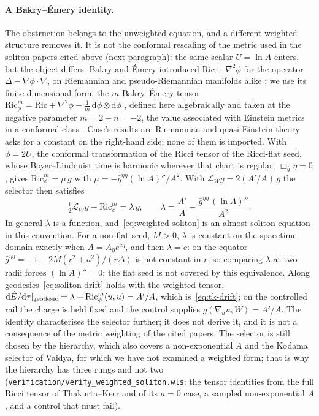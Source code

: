 \documentclass[12pt]{iopart}
\theoremstyle{plain}
\theoremstyle{definition}
\theoremstyle{remark}
\newcommand{\Ehat}{\hat E}
\newcommand{\dd}{\mathrm{d}}
\begin{document}
\paragraph{A Bakry--\'Emery identity.} The obstruction belongs to the unweighted
equation, and a different weighted structure removes it. It is not the conformal rescaling
of the metric used in the soliton papers cited above (next paragraph): the same scalar
$U=\ln A$ enters, but the object differs. Bakry and \'Emery introduced
$\mathrm{Ric}+\nabla^2\phi$ for the operator $\Delta-\nabla\phi\cdot\nabla$, on Riemannian and
pseudo-Riemannian manifolds alike \cite[Proposition~3]{BakryEmery1985}; we use its
finite-dimensional form, the $m$-Bakry--\'Emery tensor
$\mathrm{Ric}^m_\phi=\mathrm{Ric}+\nabla^2\phi-\tfrac1m\,\dd\phi\otimes\dd\phi$
\cite{Case2012SMMS}, defined here algebraically and taken at the negative parameter
$m=2-n=-2$, the value associated with Einstein metrics in a conformal class
\cite{Case2013Obstructions}. Case's results are Riemannian and quasi-Einstein theory asks for
a constant on the right-hand side; none of them is imported. With $\phi=2U$, the conformal
transformation of the Ricci tensor of the Ricci-flat seed, whose Boyer--Lindquist time is
harmonic wherever that chart is regular, $\Box_{\bar g}\eta=0$, gives
$\mathrm{Ric}^m_\phi=\mu\,g$ with $\mu=-\bar g^{\eta\eta}(\ln A)''/A^2$. With
$\mathcal L_Wg=2(A'/A)\,g$ the selector then satisfies
\begin{equation}
    \tfrac12\mathcal L_Wg+\mathrm{Ric}^m_\phi=\lambda\,g ,\qquad
    \lambda=\frac{A'}{A}-\frac{\bar g^{\eta\eta}\,(\ln A)''}{A^2} .
    \label{eq:weighted-soliton}
\end{equation}
In general $\lambda$ is a function, and~\eqref{eq:weighted-soliton} is an almost-soliton
equation in this convention. For a non-flat seed, $M>0$, $\lambda$ is constant on the
spacetime domain exactly when $A=A_0e^{c\eta}$, and then $\lambda=c$: on the equator
$\bar g^{\eta\eta}=-1-2M(r^2+a^2)/(r\Delta)$ is not constant in $r$, so comparing $\lambda$
at two radii forces $(\ln A)''=0$; the flat seed is not covered by this equivalence. Along
geodesics~\eqref{eq:soliton-drift} holds with the weighted tensor,
$\dd\Ehat/\dd\tau|_{\rm geodesic}=\lambda+\mathrm{Ric}^m_\phi(u,u)=A'/A$,
which is~\eqref{eq:tk-drift}; on the controlled rail the charge is held fixed and the
control supplies $g(\nabla_uu,W)=A'/A$. The identity characterises the selector further; it
does not derive it, and it is not a consequence of the metric weighting of the cited
papers. The selector is still chosen by the hierarchy, which also covers a
non-exponential $A$ and the Kodama selector of Vaidya, for which we have not examined a
weighted form; that is why the hierarchy has three rungs and not two
(\texttt{verification/verify\_weighted\_soliton.wls}: the tensor identities from the full
Ricci tensor of Thakurta--Kerr and of its $a=0$ case, a sampled non-exponential $A$, and a
control that must fail).
\end{document}
